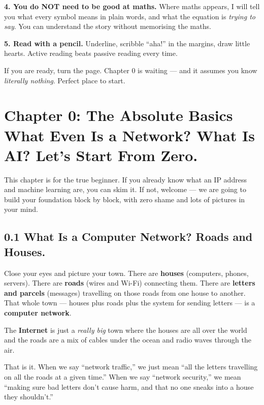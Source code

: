\documentclass[11pt,a4paper]{article}
\begin{document}
\medskip
\noindent\textbf{4. You do NOT need to be good at maths.}
Where maths appears, I will tell you what every symbol means in plain words,
and what the equation is \emph{trying to say}. You can understand the story
without memorising the maths.

\medskip
\noindent\textbf{5. Read with a pencil.}
Underline, scribble ``aha!'' in the margins, draw little hearts. Active reading
beats passive reading every time.

\medskip
If you are ready, turn the page. Chapter 0 is waiting --- and it assumes you
know \emph{literally nothing}. Perfect place to start.

\newpage

\section{Chapter 0: The Absolute Basics \\
\small What Even Is a Network? What Is AI? Let's Start From Zero.}
\label{sec:zero}

This chapter is for the true beginner. If you already know what an IP address
and machine learning are, you can skim it. If not, welcome --- we are going to
build your foundation block by block, with zero shame and lots of pictures in
your mind.

\subsection{0.1 What Is a Computer Network? Roads and Houses.}

\begin{imaginebox}
Close your eyes and picture your town. There are \textbf{houses} (computers,
phones, servers). There are \textbf{roads} (wires and Wi-Fi) connecting them.
There are \textbf{letters and parcels} (messages) travelling on those roads
from one house to another. That whole town --- houses plus roads plus the
system for sending letters --- is a \textbf{computer network}.

The \textbf{Internet} is just a \emph{really big} town where the houses are all
over the world and the roads are a mix of cables under the ocean and radio
waves through the air.
\end{imaginebox}

That is it. When we say ``network traffic,'' we just mean ``all the letters
travelling on all the roads at a given time.'' When we say ``network
security,'' we mean ``making sure bad letters don't cause harm, and that no
one sneaks into a house they shouldn't.''
\end{document}
